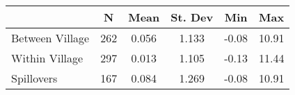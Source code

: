\begin{tabular}{l*{5}{c}}\hline&\multicolumn{1}{c}{N}&\multicolumn{1}{c}{Mean}&\multicolumn{1}{c}{St. Dev}&\multicolumn{1}{c}{Min}&\multicolumn{1}{c}{Max}\\ \hline 
Between Village & 262 & 0.056 & 1.133 & -0.08 & 10.91 \\
Within Village & 297 & 0.013 & 1.105 & -0.13 & 11.44 \\
Spillovers & 167 & 0.084 & 1.269 & -0.08 & 10.91 \\
\hline \end{tabular}
